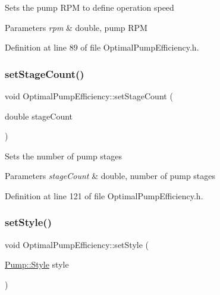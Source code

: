 Sets the pump R\+PM to define operation speed 
\begin{DoxyParams}{Parameters}
{\em rpm} & double, pump R\+PM \\
\hline
\end{DoxyParams}


Definition at line 89 of file Optimal\+Pump\+Efficiency.\+h.

\mbox{\label{class_optimal_pump_efficiency_a5b0b2a24a87c1c8fc92aa96c6ba4b727}} 
\subsubsection{\texorpdfstring{set\+Stage\+Count()}{setStageCount()}}
{\footnotesize\ttfamily void Optimal\+Pump\+Efficiency\+::set\+Stage\+Count (\begin{DoxyParamCaption}\item[{double}]{stage\+Count }\end{DoxyParamCaption})\hspace{0.3cm}{\ttfamily [inline]}}

Sets the number of pump stages 
\begin{DoxyParams}{Parameters}
{\em stage\+Count} & double, number of pump stages \\
\hline
\end{DoxyParams}


Definition at line 121 of file Optimal\+Pump\+Efficiency.\+h.

\mbox{\label{class_optimal_pump_efficiency_ab6b85c8c08d6641c5375c65436f16a2f}} 
\subsubsection{\texorpdfstring{set\+Style()}{setStyle()}}
{\footnotesize\ttfamily void Optimal\+Pump\+Efficiency\+::set\+Style (\begin{DoxyParamCaption}\item[{\hyperlink{class_pump_aef354601ce4218258cc898b35a1e90ff}{Pump\+::\+Style}}]{style }\end{DoxyParamCaption})\hspace{0.3cm}{\ttfamily [inline]}}

